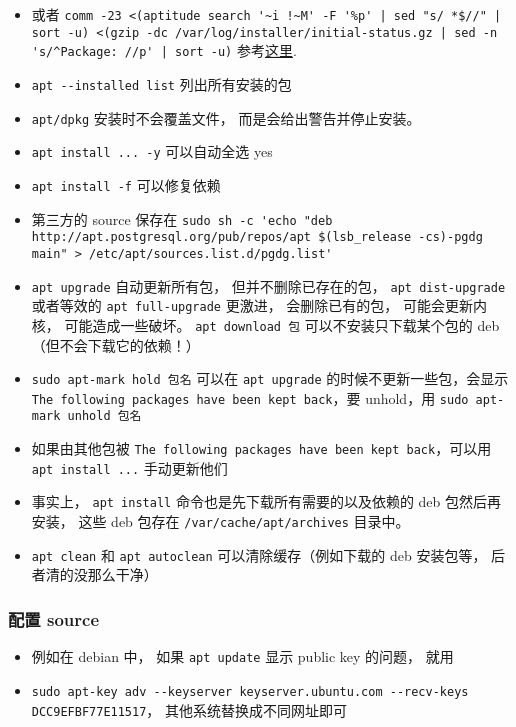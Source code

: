 \begin{itemize}
\item 或者 \verb`comm -23 <(aptitude search '~i !~M' -F '%p' | sed "s/ *$//" | sort -u) <(gzip -dc /var/log/installer/initial-status.gz | sed -n 's/^Package: //p' | sort -u)` 参考\href{https://askubuntu.com/questions/2389/how-to-list-manually-installed-packages}{这里}.
\item \verb`apt --installed list` 列出所有安装的包
\item \verb`apt/dpkg` 安装时不会覆盖文件， 而是会给出警告并停止安装。
\item \verb`apt install ... -y` 可以自动全选 yes
\item \verb`apt install -f` 可以修复依赖
\item 第三方的 source 保存在 \verb`sudo sh -c 'echo "deb http://apt.postgresql.org/pub/repos/apt $(lsb_release -cs)-pgdg main" > /etc/apt/sources.list.d/pgdg.list'`
\item \verb`apt upgrade` 自动更新所有包， 但并不删除已存在的包， \verb`apt dist-upgrade` 或者等效的 \verb`apt full-upgrade` 更激进， 会删除已有的包， 可能会更新内核， 可能造成一些破坏。
\verb`apt download 包` 可以不安装只下载某个包的 deb （但不会下载它的依赖！）
\item \verb`sudo apt-mark hold 包名` 可以在 \verb`apt upgrade` 的时候不更新一些包，会显示 \verb`The following packages have been kept back`，要 unhold，用 \verb`sudo apt-mark unhold 包名`
\item 如果由其他包被 \verb`The following packages have been kept back`，可以用 \verb`apt install ...` 手动更新他们
\item 事实上， \verb`apt install` 命令也是先下载所有需要的以及依赖的 deb 包然后再安装， 这些 deb 包存在 \verb`/var/cache/apt/archives` 目录中。
\item \verb`apt clean` 和 \verb`apt autoclean` 可以清除缓存（例如下载的 deb 安装包等， 后者清的没那么干净）
\end{itemize}


\subsubsection{配置 source}
\begin{itemize}
\item 例如在 debian 中， 如果 \verb`apt update` 显示 public key 的问题， 就用
\item \verb`sudo apt-key adv --keyserver keyserver.ubuntu.com --recv-keys DCC9EFBF77E11517`， 其他系统替换成不同网址即可
\end{itemize}

